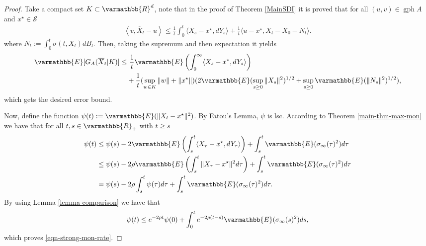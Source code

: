 \documentclass[11pt,reqno]{article}
\let\mathbb=\varmathbb
\newcommand{\R}{\mathbb{R}}
\newcommand{\gph}{\operatorname{gph}}
\newcommand{\1}{\mathds{1}}
\newcommand{\Aver}[2]{\overline{#1}_{#2}}
\numberwithin{equation}{section}  %
\theoremstyle{plain}
\theoremstyle{definition}
\theoremstyle{remark}
\numberwithin{theorem}{section}
\numberwithin{remark}{section}
\numberwithin{example}{section}
\begin{document}
    \begin{proof}
   Take a compact set $K\subset \R^d$, note that in the proof of Theorem \ref{MainSDI} it is proved that for all $(u,v)\in \gph A$ and $x^\star\in \mathcal{S}$
        \begin{equation*}
            \begin{aligned}
            \left\langle v,\Aver{X}{t}-u\right\rangle
             \leq \frac{1}{t}\int_0^t\langle X_s-x^\star,dY_s\rangle  + \frac{1}{t}\langle u-x^\star,X_t-X_0- N_t\rangle.
            \end{aligned}
        \end{equation*}
        where $N_t := \int_0^t \sigma(t,X_t)dB_t$. Then, taking the supremum and then expectation it yields
    \begin{equation*}
        \begin{aligned}
             \mathbb{E}[G_A(\Aver{X}{t}\vert K)] 
        \leq & \  \frac{1}{t}\mathbb{E}\left(  \int_0^\infty\langle X_s-x^\star,dY_s\rangle\right)\\
        &+ \frac{1}{t}(\sup_{w\in K}\|w\|+ \|x^\star\|)(2\mathbb{E}(\sup_{s\geq 0}\|X_s\|^2)^{1/2}  +\sup_{s\geq 0}\mathbb{E}(\|N_s\|^2)^{1/2}),
        \end{aligned}
    \end{equation*}
   which gets the desired error bound.
    
    \noindent Now, define the function $\psi(t) := \mathbb{E}(\|X_t-x^\star\|^2)$. By Fatou's Lemma, $\psi$ is lsc. According to Theorem \ref{main-thm-max-mon} we have that for all $t,s\in\R_+$ with $t\geq s$
    	\begin{equation*}
    		\begin{aligned}
    			\psi(t)&\leq \psi(s) -2\mathbb{E}\left(\int_s^t\langle X_\tau-x^\star,dY_\tau\rangle\right)+\int_s^t\mathbb{E}(\sigma_\infty(\tau)^2)d\tau\\
    			&\leq \psi(s) -2\rho\mathbb{E}\left(\int_s^t\|X_\tau-x^\star\|^2 d\tau\right)+\int_s^t\mathbb{E}(\sigma_\infty(\tau)^2)d\tau\\
    			&= \psi(s) -2\rho\int_s^t\psi(\tau)d\tau+\int_s^t\mathbb{E}(\sigma_\infty(\tau)^2)d\tau.
    		\end{aligned}
    	\end{equation*}
    	By using Lemma \ref{lemma-comparison} we have that
    	\begin{equation*}
    		\psi(t)\leq e^{-2\rho t}\psi(0) + \int_0^te^{-2\rho(t-s)}\mathbb{E}(\sigma_\infty(s)^2)ds,
    	\end{equation*}
        which proves \eqref{eqn-strong-mon-rate}.
    \end{proof}
\end{document}
